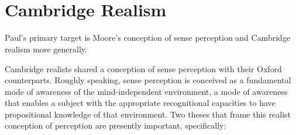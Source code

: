 \documentclass[11pt]{article}
\title{\mytitle\\
\mysubtitle}
\author{\myauthor}
\date{} %
\begin{document}
\maketitle

\setlength{\parindent}{1em}


\section{Cambridge Realism} %
\label{sec:Cambridge_realism}
Paul's primary target is Moore's conception of sense perception and Cambridge realism more generally.

Cambridge realists shared a conception of sense perception with their Oxford counterparts. Roughly speaking, sense perception is conceived as a fundamental mode of awareness of the mind-independent environment, a mode of awareness that enables a subject with the appropriate recognitional capacities to have propositional knowledge of that environment. Two theses that frame this realist conception of perception are presently important, specifically:
\end{document}
